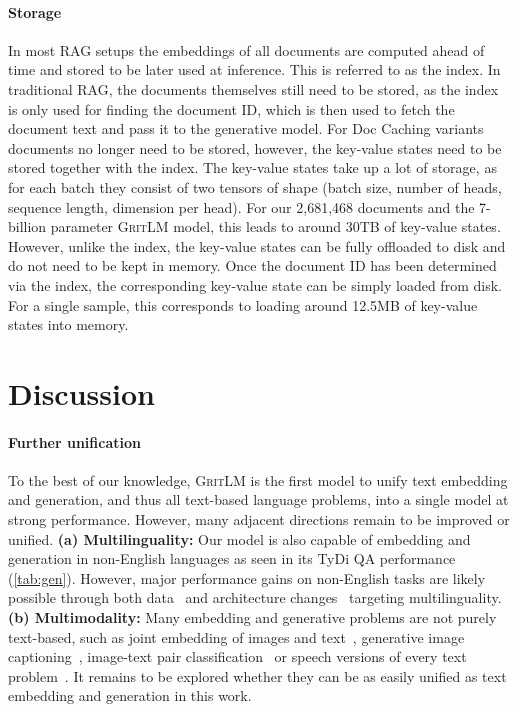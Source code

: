 \documentclass{article}
\newcommand{\model}{\textsc{GritLM}}
\begin{document}
\paragraph{Storage} In most RAG setups the embeddings of all documents are computed ahead of time and stored to be later used at inference. This is referred to as the index. In traditional RAG, the documents themselves still need to be stored, as the index is only used for finding the document ID, which is then used to fetch the document text and pass it to the generative model. For Doc Caching variants documents no longer need to be stored, however, the key-value states need to be stored together with the index. The key-value states take up a lot of storage, as for each batch they consist of two tensors of shape (batch size, number of heads, sequence length, dimension per head). For our 2,681,468 documents and the 7-billion parameter \model{} model, this leads to around 30TB of key-value states. However, unlike the index, the key-value states can be fully offloaded to disk and do not need to be kept in memory. Once the document ID has been determined via the index, the corresponding key-value state can be simply loaded from disk. For a single sample, this corresponds to loading around 12.5MB of key-value states into memory.

\section{Discussion}

\paragraph{Further unification} To the best of our knowledge, \model{} is the first model to unify text embedding and generation, and thus all text-based language problems, into a single model at strong performance. However, many adjacent directions remain to be improved or unified. \textbf{(a) Multilinguality:} Our model is also capable of embedding and generation in non-English languages as seen in its TyDi QA performance (\autoref{tab:gen}). However, major performance gains on non-English tasks are likely possible through both data~\cite{muennighoff2023crosslingual,yong2023bloom1} and architecture changes~\cite{chen2024bge,feng2022languageagnostic,duquenne2023sonar} targeting multilinguality.  \textbf{(b) Multimodality:} Many embedding and generative problems are not purely text-based, such as joint embedding of images and text~\cite{radford2021learning}, generative image captioning~\cite{hossain2018comprehensive}, image-text pair classification~\cite{muennighoff2020vilio,kiela2021hateful} or speech versions of every text problem~\cite{kamath2019deep}. It remains to be explored whether they can be as easily unified as text embedding and generation in this work.
\end{document}
